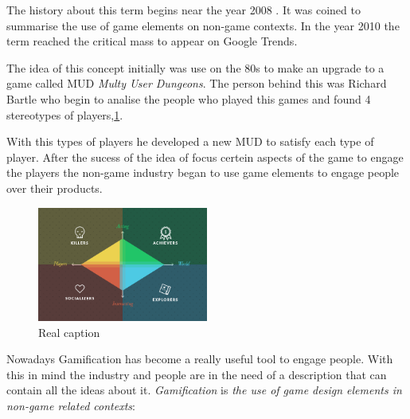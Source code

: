 The history about this term begins near the year 2008 \cite{DefineGamefication}. 
It was coined to summarise the use of game elements on non-game contexts.
In the year 2010 the term reached the critical mass to appear on Google
Trends\cite{LiCap1.3}.

The idea of this concept initially was use on the 80s to make an upgrade to a 
game called MUD \emph{Multy User Dungeons}. The person behind this was Richard Bartle
who begin to analise the people who played this games and found 4 stereotypes of
players,\ref{fig:Players}.

With this types of players he developed a new MUD to satisfy each type of player.
After the sucess of the idea of focus certein aspects of the game to engage the players
the non-game industry began to use game elements to engage people over their products. 

\begin{figure}[!htb]
  \centering
  \includegraphics[width=0.5\textwidth]{images/TypeOfPlayersBartle.png}
  \caption[Caption for LOF]{Real caption\footnotemark}
  \label{fig:Players}
\end{figure}

 	

Nowadays Gamification has become a really useful tool to engage people. With this in
mind the industry and people are in the need of a description that can contain
all the ideas about it. \emph{Gamification} is \emph{the use of game design elements
in non-game related contexts}:

